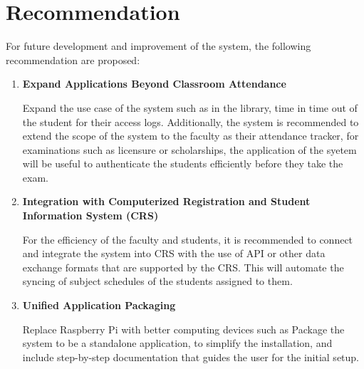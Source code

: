 \section{Recommendation}

For future development and improvement of the system, the following recommendation are proposed:

\begin{enumerate}
	\item \textbf{Expand Applications Beyond Classroom Attendance }
	
	Expand the use case of the system such as in the library, time in time out of the student for their access logs. Additionally, the system is recommended to extend the scope of the system to the faculty as their attendance tracker, for examinations such as licensure or scholarships, the application of the syetem will be useful to authenticate the students efficiently before they take the exam.

	
	\item \textbf{Integration with Computerized Registration and Student Information System (CRS)}
	
	For the efficiency of the faculty and students, it is recommended to connect and integrate the system into CRS with the use of API or other data exchange formats that are supported by the CRS. This will automate the syncing of subject schedules of the students assigned to them.
	
	\item \textbf{Unified Application Packaging}
	
	Replace Raspberry Pi with better computing devices such as Package the system to be a standalone application, to simplify the installation, and include step-by-step documentation that guides the user for the initial setup.
	
\end{enumerate}
